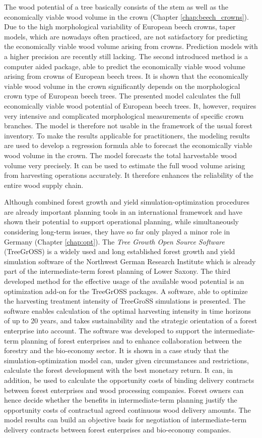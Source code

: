 The wood potential of a tree basically consists of the stem as well as the economically viable wood volume in the crown (Chapter \ref{chap:beech_crowns}). Due to the high morphological variability of European beech crowns, taper models, which are nowadays often practiced, are not satisfactory for predicting the economically viable wood volume arising from crowns. Prediction models with a higher precision are recently still lacking. The second introduced method is a computer aided package, able to predict the economically viable wood volume arising from crowns of European beech trees. It is shown that the economically viable wood volume in the crown significantly depends on the morphological crown type of European beech trees. The presented model calculates the full economically viable wood potential of European beech trees. It, however, requires very intensive and complicated morphological measurements of specific crown branches. The model is therefore not usable in the framework of the usual forest inventory. To make the results applicable for practitioners, the modeling results are used to develop a regression formula able to forecast the economically viable wood volume in the crown. The model forecasts the total harvestable wood volume very precisely. It can be used to estimate the full wood volume arising from harvesting operations accurately. It therefore enhances the reliability of the entire wood supply chain.

Although combined forest growth and yield si\-mu\-la\-tion-op\-ti\-mi\-za\-tion procedures are already important planning tools in an international framework and have shown their potential to support operational planning, while simultaneously considering long-term issues, they have so far only played a minor role in Germany (Chapter \ref{chap:opt}). The \textit{Tree Growth Open Source Software} (TreeGrOSS) is a widely used and long established forest growth and yield simulation software of the Northwest German Research Institute which is already part of the intermediate-term forest planning of Lower Saxony. The third developed method for the effective usage of the available wood potential is an optimization add-on for the TreeGrOSS packages. A software, able to optimize the harvesting treatment intensity of TreeGroSS simulations is presented. The software enables calculation of the optimal harvesting intensity in time horizons of up to 20 years, and takes sustainability and the strategic orientation of a forest enterprise into account. The software was developed to support the intermediate-term planning of forest enterprises and to enhance collaboration between the forestry and the bio-economy sector. It is shown in a case study that the si\-mu\-la\-tion-op\-ti\-mi\-za\-tion model can, under given circumstances and restrictions, calculate the forest development with the best monetary return. It can, in addition, be used to calculate the opportunity costs of binding delivery contracts between forest enterprises and wood processing companies. Forest owners can hence decide whether the benefits in intermediate-term planning justify the opportunity costs of contractual agreed continuous wood delivery amounts. The model results can build an objective basis for negotiation of intermediate-term delivery contracts between forest enterprises and bio-economy companies.